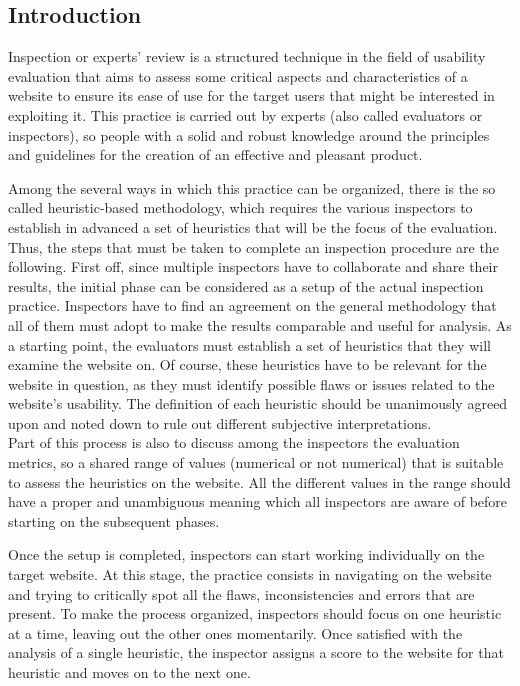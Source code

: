 \subsection{Introduction}

Inspection or experts' review is a structured technique in the field of usability evaluation that aims to assess some critical aspects and characteristics of a website to ensure its ease of use for the target users that might be interested in exploiting it.
This practice is carried out by experts (also called evaluators or inspectors), so people with a solid and robust knowledge around the principles and guidelines for the creation of an effective and pleasant product.

Among the several ways in which this practice can be organized, there is the so called heuristic-based methodology, which requires the various inspectors to establish in advanced a set of heuristics that will be the focus of the evaluation.\\
Thus, the steps that must be taken to complete an inspection procedure are the following. 
First off, since multiple inspectors have to collaborate and share their results, the initial phase can be considered as a setup of the actual inspection practice. Inspectors have to find an agreement on the general methodology that all of them must adopt to make the results comparable and useful for analysis. As a starting point, the evaluators must establish a set of heuristics that they will examine the website on. Of course, these heuristics have to be relevant for the website in question, as they must identify possible flaws or issues related to the website's usability. The definition of each heuristic should be unanimously agreed upon and noted down to rule out different subjective interpretations.\\
Part of this process is also to discuss among the inspectors the evaluation metrics, so a shared range of values (numerical or not numerical) that is suitable to assess the heuristics on the website. All the different values in the range should have a proper and unambiguous meaning which all inspectors are aware of before starting on the subsequent phases.

Once the setup is completed, inspectors can start working individually on the target website. At this stage, the practice consists in navigating on the website and trying to critically spot all the flaws, inconsistencies and errors that are present. To make the process organized, inspectors should focus on one heuristic at a time, leaving out the other ones momentarily. Once satisfied with the analysis of a single heuristic, the inspector assigns a score to the website for that heuristic and moves on to the next one.

